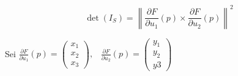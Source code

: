 \begin{bemerkung}
    \[\det(I_S) = \left \| \frac{\partial F}{\partial u_1}(p) \times \frac{\partial F}{\partial u_2}(p) \right \|^2\] 
\end{bemerkung}

\begin{beweis}\leavevmode
    Sei $\frac{\partial F}{\partial u_1}(p) = \begin{pmatrix}
        x_1\\ x_2 \\ x_3
    \end{pmatrix}, \;\;\; \frac{\partial F}{\partial u_2}(p) = \begin{pmatrix}
        y_1\\ y_2 \\ y3
    \end{pmatrix}$


\end{beweis}
